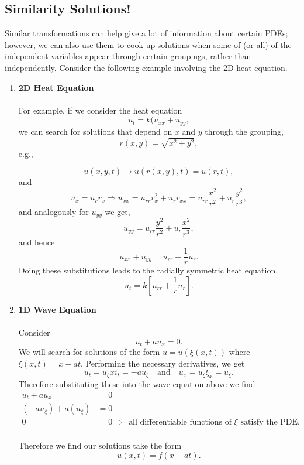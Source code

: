 %
%

\subsection{Similarity Solutions!}

Similar transformations can help give a lot of information about certain PDEs; however, we can also use them to cook up solutions when some of (or all) of the independent variables appear through certain groupings, rather than independently. Consider the following example involving the 2D heat equation.

\begin{enumerate}
\item {\bf{2D Heat Equation}} \\ \\
For example, if we consider the heat equation $$u_t = k(u_{xx} + u_{yy},$$ we can search for solutions that depend on $x$ and $y$ through the grouping, $$r(x,y) = \sqrt{x^2+y^2}, $$ e.g.,

$$u(x,y,t) \rightarrow u(r(x,y),t) = u(r,t),$$ and $$u_x = u_r r_x \Rightarrow u_{xx} = u_{rr} r_x^2 + u_r r_{xx} = u_{rr}\frac{x^2}{r^2} + u_r \frac{y^2}{r^3},$$
and analogously for $u_{yy}$ we get, $$u_{yy} = u_{rr}\frac{y^2}{r^2} + u_r \frac{x^2}{r^3},$$
and hence $$u_{xx}+u_{yy} = u_{rr}+\frac{1}{r} u_r.$$ Doing these substitutions leads to the radially symmetric heat equation, $$u_t = k\left[ u_{rr} + \frac{1}{r} u_r\right].$$

\item {\bf{1D Wave Equation}} \\ \\
Consider $$u_t + au_x = 0.$$ We will search for solutions of the form $u=u(\xi(x,t))$ where $\xi(x,t)=x-at.$ Performing the necessary derivatives, we get
$$u_t = u_\xi xi_t = -a u_\xi \ \ \ \mbox{ and } \ \ \ u_x = u_\xi \xi_x = u_\xi.$$ Therefore substituting these into the wave equation above we find
\begin{align*}
u_t + au_x &= 0 \\ 
(-au_\xi ) + a(u_\xi) &= 0\\
0&= 0 \Rightarrow \ \ \mbox{all differentiable functions of } \xi \mbox{ satisfy the PDE}.\\
\end{align*}

Therefore we find our solutions take the form $$u(x,t) = f(x-at).$$


\end{enumerate}
